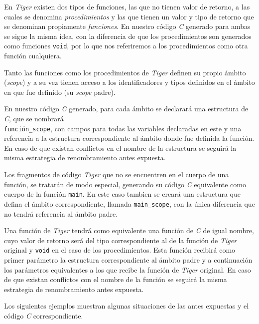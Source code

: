 \documentclass{article}
\begin{document}
En \textit{Tiger} existen dos tipos de funciones, las que no tienen valor de
retorno, a las cuales se denomina \textit{procedimientos} y las que tienen un
valor y tipo de retorno que se denominan propiamente \textit{funciones}. En
nuestro código \textit{C} generado para ambas se sigue la misma idea, con la
diferencia de que los procedimientos son generados como funciones
\texttt{void}, por lo que nos referiremos a los procedimientos como otra
función cualquiera.

Tanto las funciones como los procedimientos de \textit{Tiger} definen su propio
ámbito (\textit{scope}) y a su vez tienen acceso a los identificadores y tipos
definidos en el ámbito en que fue definido (su \textit{scope} padre).

En nuestro código \textit{C} generado, para cada ámbito se declarará una
estructura de \textit{C}, que se nombrará \\ \texttt{función\_scope}, con
campos para todas las variables declaradas en este y una referencia a la
estructura correspondiente al ámbito donde fue definida la función. En caso de
que existan conflictos en el nombre de la estructura se seguirá la misma
estrategia de renombramiento antes expuesta.

Los fragmentos de código \textit{Tiger} que no se encuentren en el
cuerpo de una función, se tratarán de modo especial, generando su
código \textit{C} equivalente como cuerpo de la función \texttt{main}. En este
caso tambien se creará una estructura que defina el ámbito correspondiente,
llamada \texttt{main\_scope}, con la única diferencia que no tendrá referencia
al ámbito padre.

Una función de \textit{Tiger} tendrá como equivalente una función de \textit{C}
de igual nombre, cuyo valor de retorno será del tipo correspondiente al de la
función de \textit{Tiger} original y \texttt{void} en el caso de los
procedimientos. Esta función recibirá como primer parámetro la estructura
correspondiente al ámbito padre y a continuación los parámetros equivalentes a
los que recibe la función de \textit{Tiger} original. En caso de que existan
conflictos con el nombre de la función se seguirá la misma estrategia de
renombramiento antes expuesta.

Los siguientes ejemplos muestran algunas situaciones de las antes expuestas y
el código \textit{C} correspondiente.
\end{document}
